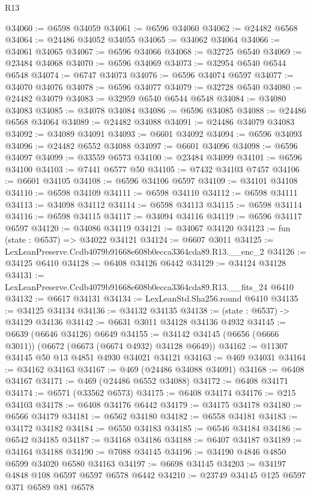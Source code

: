 \begin{lexlean}{R13}
\begin{coremodule}
@34060 := @6598 @34059
@34061 := @6596 @34060
@34062 := @24482 @6568
@34064 := @24486 @34052 @34055
@34065 := @34062 @34064
@34066 := @34061 @34065
@34067 := @6596 @34066
@34068 := @32725 @6540
@34069 := @23484 @34068
@34070 := @6596 @34069
@34073 := @32954 @6540 @6544 @6548
@34074 := @6747 @34073
@34076 := @6596 @34074 @6597
@34077 := @34070 @34076
@34078 := @6596 @34077
@34079 := @32728 @6540
@34080 := @24482 @34079
@34083 := @32959 @6540 @6544 @6548
@34084 := @34080 @34083
@34085 := @34078 @34084
@34086 := @6596 @34085
@34088 := @24486 @6568 @34064
@34089 := @24482 @34088
@34091 := @24486 @34079 @34083
@34092 := @34089 @34091
@34093 := @6601 @34092
@34094 := @6596 @34093
@34096 := @24482 @6552 @34088
@34097 := @6601 @34096
@34098 := @6596 @34097
@34099 := @33559 @6573
@34100 := @23484 @34099
@34101 := @6596 @34100
@34103 := @7441 @6577 @50
@34105 := @7432 @34103 @7457
@34106 := @6601 @34105
@34108 := @6596 @34106 @6597
@34109 := @34101 @34108
@34110 := @6598 @34109
@34111 := @6598 @34110
@34112 := @6598 @34111
@34113 := @34098 @34112
@34114 := @6598 @34113
@34115 := @6598 @34114
@34116 := @6598 @34115
@34117 := @34094 @34116
@34119 := @6596 @34117 @6597
@34120 := @34086 @34119
@34121 := @34067 @34120
@34123 := fun (state : @6537) => @34022 @34121
@34124 := @6607 @3011
@34125 := LexLeanPreserve.Ccdb4079b91668e608b0ecca3364cda89.R13.__enc_2
@34126 := @34125 @6410
@34128 := @6408 @34126 @6442
@34129 := @34124 @34128
@34131 := LexLeanPreserve.Ccdb4079b91668e608b0ecca3364cda89.R13.__fits_24 @6410
@34132 := @6617 @34131
@34134 := LexLeanStd.Sha256.round @6410
@34135 := @34125 @34134
@34136 := @34132 @34135
@34138 := (state : @6537) -> @34129 @34136
@34142 := @6631 @3011 @34128 @34136 @4932
@34145 := @6639 (@6646 @34126) @6649
@34155 := @34142 @34145 (@6656 (@6666 @3011)) (@6672 (@6673 (@6674 @4932) @34128 @6649))
@34162 := @11307 @34145 @50 @13 @4851 @4930 @34021 @34121
@34163 := @469 @34031
@34164 := @34162 @34163
@34167 := @469 (@24486 @34088 @34091)
@34168 := @6408 @34167
@34171 := @469 (@24486 @6552 @34088)
@34172 := @6408 @34171
@34174 := @6571 (@33562 @6573)
@34175 := @6408 @34174
@34176 := @215 @34103
@34178 := @6408 @34176 @6442
@34179 := @34175 @34178
@34180 := @6566 @34179
@34181 := @6562 @34180
@34182 := @6558 @34181
@34183 := @34172 @34182
@34184 := @6550 @34183
@34185 := @6546 @34184
@34186 := @6542 @34185
@34187 := @34168 @34186
@34188 := @6407 @34187
@34189 := @34164 @34188
@34190 := @7088 @34145
@34196 := @34190 @4846 @4850 @6599 @34020 @6580 @34163
@34197 := @6698 @34145
@34203 := @34197 @4848 @108 @6597 @6597 @6578 @6442
@34210 := @23749 @34145 @125 @6597 @371 @6589 @81 @6578

\end{coremodule}
\end{lexlean}
